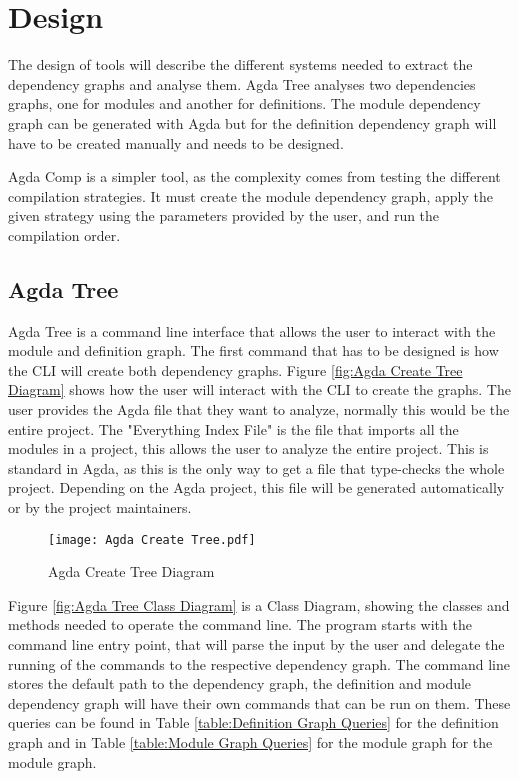
\chapter{Design}


The design of tools will describe the different systems needed to extract the
dependency graphs and analyse them. Agda Tree analyses two dependencies graphs,
one for modules and another for definitions. The module dependency graph can be
generated with Agda but for the definition dependency graph will have to be
created manually and needs to be designed.

Agda Comp is a simpler tool, as the complexity comes from testing the different
compilation strategies. It must create the module dependency graph, apply the
given strategy using the parameters provided by the user, and run the compilation
order. 


\pagebreak

\section{Agda Tree}

Agda Tree is a command line interface that allows the user to interact with the
module and definition graph. The first command that has to be designed is how
the CLI will create both dependency graphs. Figure \ref{fig:Agda Create Tree
Diagram} shows how the user will interact with the CLI to create the graphs.
The user provides the Agda file that they want to analyze, normally this would
be the entire project. The "Everything Index File" is the file that imports all
the modules in a project, this allows the user to analyze the entire project.
This is standard in Agda, as this is the only way to get a file that type-checks the whole project. Depending on the Agda project, this file will be
generated automatically or by the project maintainers.
\begin{figure}[H]
    \centering
    \texttt{[image: Agda Create Tree.pdf]}
    \caption{Agda Create Tree Diagram}
    \label{fig:Agda Create Tree Diagram}
\end{figure} 

\pagebreak

Figure \ref{fig:Agda Tree Class Diagram} is a Class Diagram, showing the
classes and methods needed to operate the command line. The program starts with
the command line entry point, that will parse the input by the user and
delegate the running of the commands to the respective dependency graph. The
command line stores the default path to the dependency graph, the definition
and module dependency graph will have their own commands that can be run on
them. These queries can be found in Table \ref{table:Definition Graph Queries}
for the definition graph and in Table \ref{table:Module Graph Queries} for the
module graph for the module graph.

